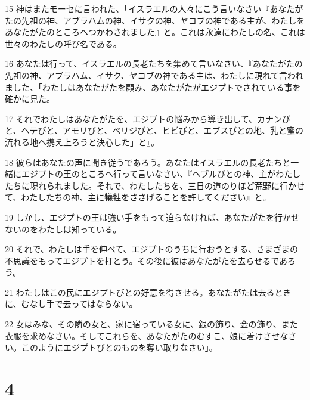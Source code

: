 \par 15 神はまたモーセに言われた、「イスラエルの人々にこう言いなさい『あなたがたの先祖の神、アブラハムの神、イサクの神、ヤコブの神である主が、わたしをあなたがたのところへつかわされました』と。これは永遠にわたしの名、これは世々のわたしの呼び名である。
\par 16 あなたは行って、イスラエルの長老たちを集めて言いなさい、『あなたがたの先祖の神、アブラハム、イサク、ヤコブの神である主は、わたしに現れて言われました、「わたしはあなたがたを顧み、あなたがたがエジプトでされている事を確かに見た。
\par 17 それでわたしはあなたがたを、エジプトの悩みから導き出して、カナンびと、ヘテびと、アモリびと、ペリジびと、ヒビびと、エブスびとの地、乳と蜜の流れる地へ携え上ろうと決心した」と』。
\par 18 彼らはあなたの声に聞き従うであろう。あなたはイスラエルの長老たちと一緒にエジプトの王のところへ行って言いなさい、『ヘブルびとの神、主がわたしたちに現れられました。それで、わたしたちを、三日の道のりほど荒野に行かせて、わたしたちの神、主に犠牲をささげることを許してください』と。
\par 19 しかし、エジプトの王は強い手をもって迫らなければ、あなたがたを行かせないのをわたしは知っている。
\par 20 それで、わたしは手を伸べて、エジプトのうちに行おうとする、さまざまの不思議をもってエジプトを打とう。その後に彼はあなたがたを去らせるであろう。
\par 21 わたしはこの民にエジプトびとの好意を得させる。あなたがたは去るときに、むなし手で去ってはならない。
\par 22 女はみな、その隣の女と、家に宿っている女に、銀の飾り、金の飾り、また衣服を求めなさい。そしてこれらを、あなたがたのむすこ、娘に着けさせなさい。このようにエジプトびとのものを奪い取りなさい」。

\chapter{4}

